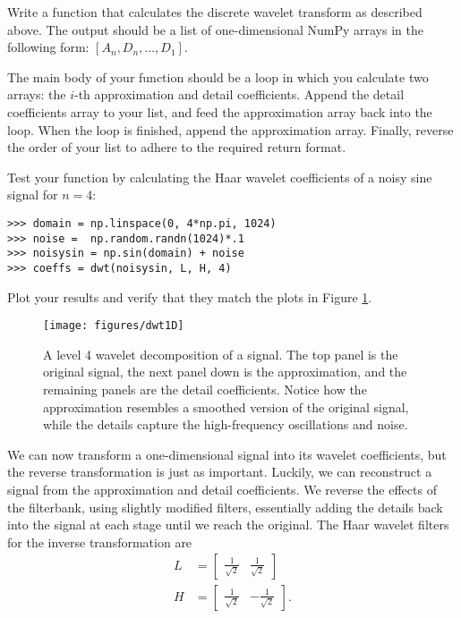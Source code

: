 \begin{problem}
Write a function that calculates the discrete wavelet transform as described above.
The output should be a list of one-dimensional NumPy arrays in the
following form: $[A_n, D_n, \ldots, D_1]$.

The main body of your function should be a loop in which you calculate two arrays: the $i$-th approximation
and detail coefficients. Append the detail coefficients array to your list, and feed the approximation array
back into the loop. When the loop is finished, append the approximation array. Finally, reverse the order of your list
to adhere to the required return format.

Test your function by calculating the Haar wavelet coefficients of a noisy sine signal for $n=4$:

\begin{lstlisting}
>>> domain = np.linspace(0, 4*np.pi, 1024)
>>> noise =  np.random.randn(1024)*.1
>>> noisysin = np.sin(domain) + noise
>>> coeffs = dwt(noisysin, L, H, 4)
\end{lstlisting}

Plot your results and verify that they match the plots in Figure \ref{fig:dwt1D}.
\end{problem}

\begin{figure}[H]
\centering
\texttt{[image: figures/dwt1D]}
\caption{A level 4 wavelet decomposition of a signal. The top panel is the original signal,
the next panel down is the approximation, and the remaining panels are the detail coefficients.
Notice how the approximation resembles a smoothed version of the original signal, while the
details capture the high-frequency oscillations and noise.}
\label{fig:dwt1D}
\end{figure}

We can now transform a one-dimensional signal into its wavelet coefficients,
but the reverse transformation is just as important.
Luckily, we can reconstruct a signal from the approximation and detail coefficients.
We reverse the effects of the filterbank, using slightly modified filters, essentially adding the details back into the
signal at each stage until we reach the original.
The Haar wavelet filters for the inverse transformation are
\begin{align*}
L &= \begin{bmatrix}\frac{1}{\sqrt{2}} & \frac{1}{\sqrt{2}}\end{bmatrix}\\
H &= \begin{bmatrix}\frac{1}{\sqrt{2}} & -\frac{1}{\sqrt{2}}\end{bmatrix}.
\end{align*}

